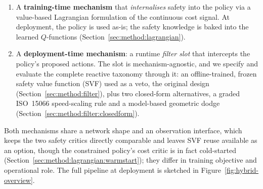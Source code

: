 \documentclass[11pt,a4paper]{report}
\newcommand{\iso}{ISO~15066}
\begin{document}
\begin{enumerate}[topsep=2pt,itemsep=2pt]
\item A \textbf{training-time mechanism} that \emph{internalises}
  safety into the policy via a value-based Lagrangian formulation
  of the continuous cost signal. At deployment, the policy is
  used as-is; the safety knowledge is baked into the learned
  $Q$-functions (Section~\ref{sec:method:lagrangian}).
\item A \textbf{deployment-time mechanism}: a runtime \emph{filter
  slot} that intercepts the policy's proposed actions. The slot is
  mechanism-agnostic, and we specify and evaluate the complete
  reactive taxonomy through it: an offline-trained, frozen safety
  value function (SVF) used as a veto, the original design
  (Section~\ref{sec:method:filter}), plus two closed-form
  alternatives, a graded \iso{} speed-scaling rule and a model-based
  geometric dodge (Section~\ref{sec:method:filter:closedform}).
\end{enumerate}

Both mechanisms share a network shape and an observation interface,
which keeps the two safety critics directly comparable and leaves SVF
reuse available as an option, though the constrained policy's cost
critic is in fact cold-started
(Section~\ref{sec:method:lagrangian:warmstart}); they differ in
training objective and operational role. The full pipeline at
deployment is sketched in Figure~\ref{fig:hybrid-overview}.
\end{document}
